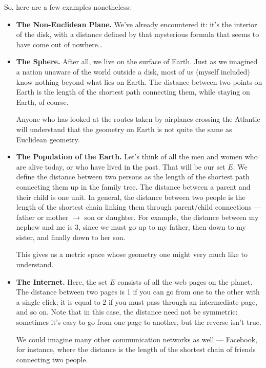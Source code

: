 \documentclass{amsart}
\begin{document}
So, here are a few examples nonetheless:
\begin{itemize}[left=0pt]
\item \textbf{The Non-Euclidean Plane.}  We’ve already encountered it:
  it’s the interior of the disk, with a distance defined by that
  mysterious formula that seems to have come out of nowhere\dots{}

\item \textbf{The Sphere.}  After all, we live on the surface of
  Earth. Just as we imagined a nation unaware of the world outside a
  disk, most of us (myself included) know nothing
  beyond what lies on Earth. The distance between two points on Earth
  is the length of the shortest path connecting them, while staying
  on Earth, of course.

  Anyone who has looked at the routes taken by airplanes crossing the
  Atlantic will understand that the geometry on Earth is not quite the
  same as Euclidean geometry.

\item \textbf{The Population of the Earth.}  Let’s think of all the
  men and women who are alive today, or who have lived in the
  past. That will be our set $E$. We define the distance between two
  persons as the length of the shortest path connecting them up in the
  family tree. The distance between a parent and their child is one
  unit.
  In general, the distance between two people is the length of the
  shortest chain linking them through parent/child connections ---
  father or mother $\to$ son or daughter.%
  For example, the distance between my nephew and me is 3, since we
  must go up to my father, then down to my sister, and finally down to
  her son.

  This gives us a metric space whose geometry one might very much like
  to understand.

\item \textbf{The Internet.}  Here, the set $E$ consists of all the
  web pages on the planet. The distance between two pages is 1 if you
  can go from one to the other with a single click; it is equal to 2
  if you must pass through an intermediate page, and so on.  Note that
  in this case, the distance need not be symmetric: sometimes it’s
  easy to go from one page to another, but the reverse isn’t true.

  We could imagine many other communication networks as well ---
  Facebook, for instance, where the distance is the length of the
  shortest chain of friends connecting two people.
  

\end{itemize}
\end{document}
